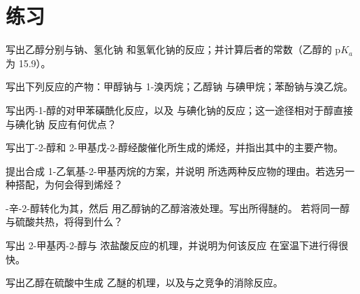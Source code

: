 \section{练习}

\begin{exercise}[$\star$]\label{exo:b1:alcohol-activation:1}
写出乙醇分别与钠、氢化钠
和氢氧化钠的反应；并计算后者的常数（乙醇的 $\mathrm{p}K_a$
为 15.9）。
\end{exercise}

\begin{exercise}[$\star$]\label{exo:b1:alcohol-activation:2}
写出下列反应的产物：甲醇钠与 1-溴丙烷；乙醇钠
与碘甲烷；苯酚钠与溴乙烷。
\end{exercise}

\begin{exercise}[$\star$]\label{exo:b1:alcohol-activation:3}
写出丙-1-醇的对甲苯磺酰化反应，以及
与碘化钠的反应；这一途径相对于醇直接与碘化钠
反应有何优点？
\end{exercise}

\begin{exercise}[$\star$]\label{exo:b1:alcohol-activation:4}
写出丁-2-醇和
2-甲基戊-2-醇经酸催化所生成的烯烃，并指出其中的主要产物。
\end{exercise}

\begin{exercise}[$\star\star$]\label{exo:b1:alcohol-activation:5}
提出合成 1-乙氧基-2-甲基丙烷的方案，并说明
所选两种反应物的理由。若选另一种搭配，为何会得到烯烃？
\end{exercise}

\begin{exercise}[$\star\star$]\label{exo:b1:alcohol-activation:6}
-辛-2-醇转化为其，然后
用乙醇钠的乙醇溶液处理。写出所得醚的。
若将同一醇与硫酸共热，将得到什么？
\end{exercise}

\begin{exercise}[$\star\star$]\label{exo:b1:alcohol-activation:7}
写出 2-甲基丙-2-醇与
浓盐酸反应的机理，并说明为何该反应
在室温下进行得很快。
\end{exercise}

\begin{exercise}[$\star\star$]\label{exo:b1:alcohol-activation:8}
写出乙醇在硫酸中生成
乙醚的机理，以及与之竞争的消除反应。
\end{exercise}

